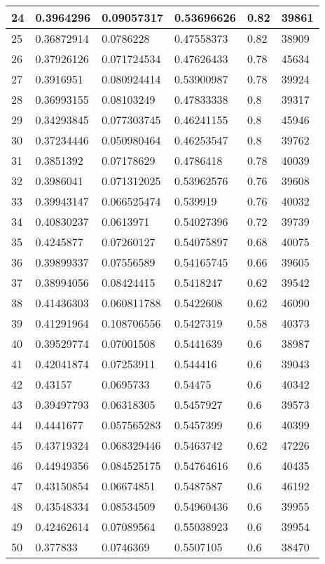 \begin{longtable}{|l|l|l|l|l|l|}
24 & 0.3964296 & 0.09057317 & 0.53696626 & 0.82 & 39861 \\ \hline 
25 & 0.36872914 & 0.0786228 & 0.47558373 & 0.82 & 38909 \\ \hline 
26 & 0.37926126 & 0.071724534 & 0.47626433 & 0.78 & 45634 \\ \hline 
27 & 0.3916951 & 0.080924414 & 0.53900987 & 0.78 & 39924 \\ \hline 
28 & 0.36993155 & 0.08103249 & 0.47833338 & 0.8 & 39317 \\ \hline 
29 & 0.34293845 & 0.077303745 & 0.46241155 & 0.8 & 45946 \\ \hline 
30 & 0.37234446 & 0.050980464 & 0.46253547 & 0.8 & 39762 \\ \hline 
31 & 0.3851392 & 0.07178629 & 0.4786418 & 0.78 & 40039 \\ \hline 
32 & 0.3986041 & 0.071312025 & 0.53962576 & 0.76 & 39608 \\ \hline 
33 & 0.39943147 & 0.066525474 & 0.539919 & 0.76 & 40032 \\ \hline 
34 & 0.40830237 & 0.0613971 & 0.54027396 & 0.72 & 39739 \\ \hline 
35 & 0.4245877 & 0.07260127 & 0.54075897 & 0.68 & 40075 \\ \hline 
36 & 0.39899337 & 0.07556589 & 0.54165745 & 0.66 & 39605 \\ \hline 
37 & 0.38994056 & 0.08424415 & 0.5418247 & 0.62 & 39542 \\ \hline 
38 & 0.41436303 & 0.060811788 & 0.5422608 & 0.62 & 46090 \\ \hline 
39 & 0.41291964 & 0.108706556 & 0.5427319 & 0.58 & 40373 \\ \hline 
40 & 0.39529774 & 0.07001508 & 0.5441639 & 0.6 & 38987 \\ \hline 
41 & 0.42041874 & 0.07253911 & 0.544416 & 0.6 & 39043 \\ \hline 
42 & 0.43157 & 0.0695733 & 0.54475 & 0.6 & 40342 \\ \hline 
43 & 0.39497793 & 0.06318305 & 0.5457927 & 0.6 & 39573 \\ \hline 
44 & 0.4441677 & 0.057565283 & 0.5457399 & 0.6 & 40399 \\ \hline 
45 & 0.43719324 & 0.068329446 & 0.5463742 & 0.62 & 47226 \\ \hline 
46 & 0.44949356 & 0.084525175 & 0.54764616 & 0.6 & 40435 \\ \hline 
47 & 0.43150854 & 0.06674851 & 0.5487587 & 0.6 & 46192 \\ \hline 
48 & 0.43548334 & 0.08534509 & 0.54960436 & 0.6 & 39955 \\ \hline 
49 & 0.42462614 & 0.07089564 & 0.55038923 & 0.6 & 39954 \\ \hline 
50 & 0.377833 & 0.0746369 & 0.5507105 & 0.6 & 38470 \\ \hline 
\end{longtable}
